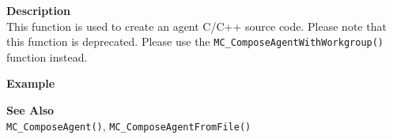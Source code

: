 \noindent
{\bf Description}\\
This function is used to create an agent C/C++ source code. Please note that
this function is deprecated. Please use the
\texttt{MC\_ComposeAgentWithWorkgroup()} function instead.

\noindent
{\bf Example}\\
\noindent
{\footnotesize}

\noindent
{\bf See Also}\\
\texttt{MC\_ComposeAgent()}, \texttt{MC\_ComposeAgentFromFile()}

